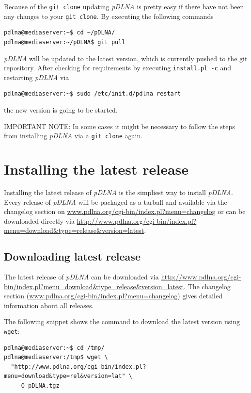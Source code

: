 \documentclass[a4paper,oneside,10pt]{report}
\newenvironment{colframeimportantnote}{%
  \begin{Sbox}
    \begin{minipage}{.99\columnwidth}
}{%
  \end{minipage}
  \end{Sbox}
  \begin{center}
    \fcolorbox{black}{Orange}{\TheSbox}
  \end{center}
}
\begin{document}
Because of the \verb|git clone| updating {\em pDLNA} is pretty easy if there have not been any changes to your \verb|git clone|. By executing the following commands
\begin{lstlisting}
pdlna@mediaserver:~$ cd ~/pDLNA/
pdlna@mediaserver:~/pDLNA$ git pull
\end{lstlisting}
{\em pDLNA} will be updated to the latest version, which is currently pushed to the git repository. After checking for requirements by executing \verb|install.pl -c| and restarting {\em pDLNA} via
\begin{lstlisting}
pdlna@mediaserver:~$ sudo /etc/init.d/pdlna restart
\end{lstlisting}
the new version is going to be started.

\begin{colframeimportantnote}
\textsc{IMPORTANT NOTE:} In some cases it might be necessary to follow the steps from installing {\em pDLNA} via a \verb|git clone| again.
\end{colframeimportantnote}

\section{Installing the latest release}
\label{install-unix-latestrelease}

Installing the latest release of {\em pDLNA} is the simpliest way to install {\em pDLNA}. Every release of {\em pDLNA} will be packaged as a tarball and available via the changelog section on \url{www.pdlna.org/cgi-bin/index.pl?menu=changelog} or can be downloaded directly via \url{http://www.pdlna.org/cgi-bin/index.pl?menu=download&type=release&version=latest}.

\subsection{Downloading latest release}
\label{install-unix-latest-release-download}

The latest release of {\em pDLNA} can be downloaded via \url{http://www.pdlna.org/cgi-bin/index.pl?menu=download&type=release&version=latest}. The changelog section (\url{www.pdlna.org/cgi-bin/index.pl?menu=changelog}) gives detailed information about all releases.

The following snippet shows the command to download the latest version using \verb|wget|:
\begin{lstlisting}
pdlna@mediaserver:~$ cd /tmp/
pdlna@mediaserver:/tmp$ wget \
  "http://www.pdlna.org/cgi-bin/index.pl?menu=download&type=rel&version=lat" \
	-O pDLNA.tgz
\end{lstlisting}
\end{document}
